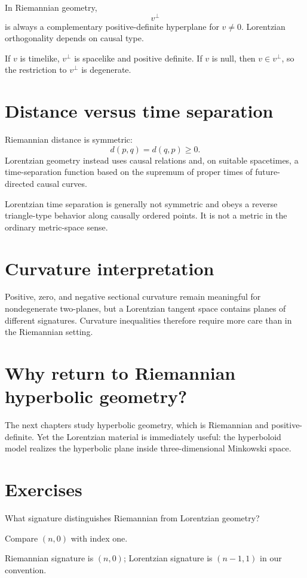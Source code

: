 In Riemannian geometry,
\[
v^\perp
\]
is always a complementary positive-definite hyperplane for \(v\ne0\).  Lorentzian
orthogonality depends on causal type.

\begin{proposition}\label{prop:vii30-orth}
If \(v\) is timelike, \(v^\perp\) is spacelike and positive definite.  If \(v\) is
null, then \(v\in v^\perp\), so the restriction to \(v^\perp\) is degenerate.
\end{proposition}

\section{Distance versus time separation}

Riemannian distance is symmetric:
\[
d(p,q)=d(q,p)\ge0.
\]
Lorentzian geometry instead uses causal relations and, on suitable spacetimes, a
time-separation function based on the supremum of proper times of future-directed
causal curves.

\begin{warning}\label{warn:vii30-time-separation}
Lorentzian time separation is generally not symmetric and obeys a reverse
triangle-type behavior along causally ordered points.  It is not a metric in the
ordinary metric-space sense.
\end{warning}

\section{Curvature interpretation}

Positive, zero, and negative sectional curvature remain meaningful for
nondegenerate two-planes, but a Lorentzian tangent space contains planes of
different signatures.  Curvature inequalities therefore require more care than in
the Riemannian setting.

\section{Why return to Riemannian hyperbolic geometry?}

The next chapters study hyperbolic geometry, which is Riemannian and
positive-definite.  Yet the Lorentzian material is immediately useful: the
hyperboloid model realizes the hyperbolic plane inside three-dimensional Minkowski
space.

\section{Exercises}
\begin{exercise}\label{exr:vii30-01}
What signature distinguishes Riemannian from Lorentzian geometry?
\end{exercise}
\begin{hint}
Compare \((n,0)\) with index one.
\end{hint}
\begin{solution}
Riemannian signature is \((n,0)\); Lorentzian signature is \((n-1,1)\) in our convention.
\end{solution}

